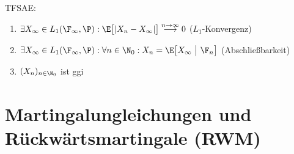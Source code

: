 \begin{itemize}
		TFSAE:
		\begin{enumerate}[label=(\alph*)]
			\item $\begin{aligned}
				\exists X_\infty\in L_1(\F_\infty,\P):\E\big[|X_n-X_\infty|\big]\stackrel{n\to\infty}{\longrightarrow}0
			\end{aligned}$ ($L_1$-Konvergenz)
			\item $\begin{aligned}
				\exists X_\infty\in L_1(\F_\infty,\P):\forall n\in\N_0: X_n=\E\big[X_\infty~\big|~\F_n\big]
			\end{aligned}$ (Abschließbarkeit)
			\item $\begin{aligned}
				(X_n)_{n\in\N_0}
			\end{aligned}$ ist ggi
		\end{enumerate}
	\end{itemize}
	
	\section{Martingalungleichungen und Rückwärtsmartingale (RWM)}
	
